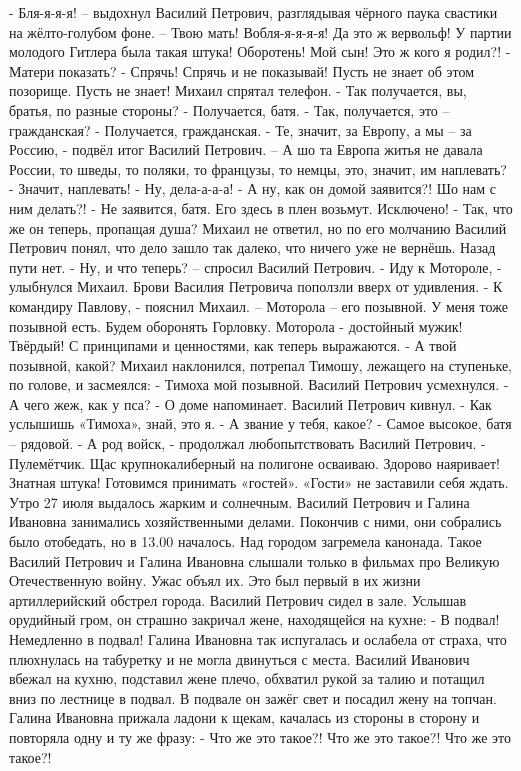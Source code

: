 - Бля-я-я-я! – выдохнул Василий Петрович, разглядывая чёрного паука свастики на жёлто-голубом фоне. – Твою мать! Вобля-я-я-я-я! Да это ж вервольф! У партии молодого Гитлера была такая штука! Оборотень! Мой сын! Это ж кого я родил?!
- Матери показать?
- Спрячь! Спрячь и не показывай! Пусть не знает об этом позорище.  Пусть не знает!
Михаил спрятал телефон.
- Так получается, вы, братья, по разные стороны?
- Получается, батя.
- Так, получается, это – гражданская?
- Получается, гражданская.
- Те, значит, за Европу, а мы – за Россию, - подвёл итог Василий Петрович. – А шо та Европа житья не давала России, то шведы, то поляки, то французы, то немцы, это, значит, им наплевать?
- Значит, наплевать!
- Ну, дела-а-а-а!
- А ну, как он домой заявится?! Шо нам с ним делать?!
- Не заявится, батя. Его здесь в плен возьмут. Исключено!
- Так, что же он теперь, пропащая душа?
Михаил не ответил, но по его молчанию Василий Петрович понял, что дело зашло так далеко, что ничего уже не вернёшь. Назад пути нет.
- Ну, и что теперь? – спросил Василий Петрович.
- Иду к Мотороле, - улыбнулся Михаил.
Брови Василия Петровича поползли вверх от удивления.
- К командиру Павлову, - пояснил Михаил. – Моторола – его позывной. У меня тоже позывной есть. Будем оборонять Горловку. Моторола - достойный мужик! Твёрдый! С принципами и ценностями, как теперь выражаются.
- А твой позывной, какой?
Михаил наклонился, потрепал Тимошу, лежащего на ступеньке, по голове, и засмеялся:
- Тимоха мой позывной.
Василий Петрович усмехнулся.
- А чего жеж, как у пса?
- О доме напоминает.
Василий Петрович кивнул.
- Как услышишь «Тимоха», знай, это я.
- А звание у тебя, какое?
- Самое высокое, батя – рядовой.
- А род войск, - продолжал любопытствовать Василий Петрович.
- Пулемётчик. Щас крупнокалиберный на полигоне осваиваю. Здорово наяривает! Знатная штука! Готовимся принимать «гостей».
«Гости» не заставили себя ждать.
Утро  27 июля выдалось жарким и солнечным. Василий Петрович и Галина Ивановна занимались хозяйственными делами. Покончив с ними, они собрались было отобедать, но в 13.00 началось. Над городом загремела канонада. Такое Василий Петрович и Галина Ивановна слышали только в фильмах про Великую Отечественную войну. Ужас объял их. Это был первый в их жизни артиллерийский обстрел города.
Василий Петрович сидел в зале. Услышав орудийный гром, он страшно закричал жене, находящейся на кухне: - В подвал! Немедленно в подвал!
Галина Ивановна так испугалась и ослабела от страха, что плюхнулась на табуретку и не могла двинуться с места. Василий Иванович вбежал на кухню, подставил жене плечо, обхватил рукой за талию и потащил вниз по лестнице в подвал. В подвале он зажёг свет и посадил жену на топчан. Галина Ивановна прижала ладони к щекам, качалась из стороны в сторону и повторяла одну и ту же фразу: - Что же это такое?! Что же это такое?! Что же это такое?!
